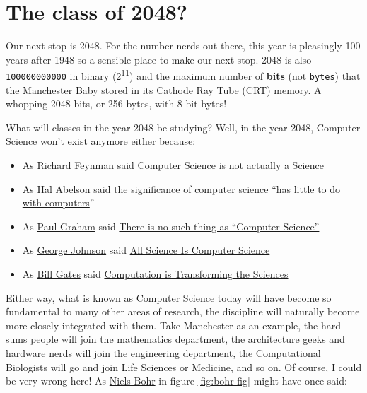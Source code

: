 \documentclass[
  12pt,
]{book}
\providecommand{\tightlist}{%
  \setlength{\itemsep}{0pt}\setlength{\parskip}{0pt}}
\begin{document}
\hypertarget{y2048}{%
\section{The class of 2048?}\label{y2048}}

Our next stop is 2048. For the number nerds out there, this year is pleasingly 100 years after 1948 so a sensible place to make our next stop. 2048 is also \texttt{100000000000} in binary (2\textsuperscript{11}) and the maximum number of \textbf{bits} (not \texttt{bytes}) that the Manchester Baby stored in its Cathode Ray Tube (CRT) memory. A whopping 2048 bits, or 256 bytes, with 8 bit bytes! \citep{kilburnphd}

What will classes in the year 2048 be studying? Well, in the year 2048, Computer Science won't exist anymore either because:

\begin{itemize}
\tightlist
\item
  As \href{https://en.wikipedia.org/wiki/Richard_Feynman}{Richard Feynman} said \href{https://www.flickr.com/photos/dullhunk/51956613478/}{Computer Science is not actually a Science} \citep{feynmanfysics}
\item
  As \href{https://en.wikipedia.org/wiki/Hal_Abelson}{Hal Abelson} said the significance of computer science ``\href{https://mitpress.mit.edu/sites/default/files/sicp/full-text/book/book-Z-H-7.html}{has little to do with computers}'' \citep{abelson}
\item
  As \href{https://en.wikipedia.org/wiki/Paul_Graham_(programmer)}{Paul Graham} said \href{http://www.paulgraham.com/hp.html}{There is no such thing as ``Computer Science''} \citep{bloggersandpainters, hackersandpainters}
\item
  As \href{https://en.wikipedia.org/wiki/George_Johnson_\%28writer\%29}{George Johnson} said \href{https://www.nytimes.com/2001/03/25/weekinreview/the-world-in-silica-fertilization-all-science-is-computer-science.html}{All Science Is Computer Science} \citep{georgejohnson}
\item
  As \href{https://en.wikipedia.org/wiki/Bill_Gates}{Bill Gates} said \href{https://web.archive.org/web/20080221053710/https://www.microsoft.com/presspass/exec/billg/speeches/2005/11-15SuperComputing05.aspx}{Computation is Transforming the Sciences} \citep{gatescompute}
\end{itemize}

Either way, what is known as \href{https://en.wikipedia.org/wiki/Computer_science}{Computer Science} today will have become so fundamental to many other areas of research, the discipline will naturally become more closely integrated with them. Take Manchester as an example, the hard-sums people will join the mathematics department, the architecture geeks and hardware nerds will join the engineering department, the Computational Biologists will go and join Life Sciences or Medicine, and so on. Of course, I could be very wrong here! As \href{https://en.wikipedia.org/wiki/Niels_Bohr}{Niels Bohr} in figure \ref{fig:bohr-fig} might have once said:
\end{document}
